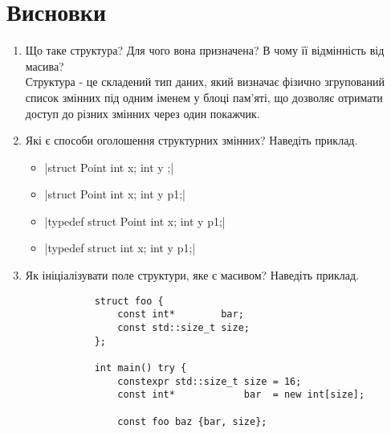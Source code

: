 \section{Висновки}
\label{sec:summary}

\begin{enumerate}
    \item Що таке структура? Для чого вона призначена? В чому її відмінність від масива? \\
          Структура - це складений тип даних, який визначає фізично
          згрупований список змінних під одним іменем у блоці пам'яті,
          що дозволяє отримати доступ до різних змінних через один покажчик.
    \item Які є способи оголошення структурних змінних? Наведіть приклад.
          \begin{itemize}
              \item {}|struct Point { int x; int y };|
              \item {}|struct Point { int x; int y } p1;|
              \item {}|typedef struct Point { int x; int y } p1;|
              \item {}|typedef struct { int x; int y } p1;|
          \end{itemize}
    \item Як ініціалізувати поле структури, яке є масивом? Наведіть приклад.
          \begin{verbatim}
            struct foo {
                const int*        bar;
                const std::size_t size;
            };

            int main() try {
                constexpr std::size_t size = 16;
                const int*            bar  = new int[size];

                const foo baz {bar, size};


\end{verbatim}
\end{enumerate}
